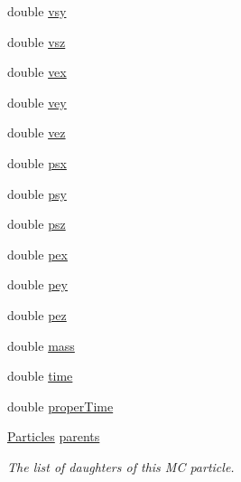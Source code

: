 \begin{DoxyCompactItemize}
\item 
double \hyperlink{class_d_d4hep_1_1_simulation_1_1_geant4_particle_a59b9d6e764aa6ea6c2cf011aba056c29}{vsy}
\item 
double \hyperlink{class_d_d4hep_1_1_simulation_1_1_geant4_particle_aba9c37b5693ebe378cd17519228daa3d}{vsz}
\item 
double \hyperlink{class_d_d4hep_1_1_simulation_1_1_geant4_particle_a28b83040272870e04caff34da5846464}{vex}
\item 
double \hyperlink{class_d_d4hep_1_1_simulation_1_1_geant4_particle_a1befe26ea99280bd0a57d6d858165ef6}{vey}
\item 
double \hyperlink{class_d_d4hep_1_1_simulation_1_1_geant4_particle_a63ac22451aea71547d69c407ae4824da}{vez}
\item 
double \hyperlink{class_d_d4hep_1_1_simulation_1_1_geant4_particle_a2c169e0bf0dc706a43254c4c8ca9ccc2}{psx}
\item 
double \hyperlink{class_d_d4hep_1_1_simulation_1_1_geant4_particle_abc3b6008b4d4366bce059fa360e8d3c7}{psy}
\item 
double \hyperlink{class_d_d4hep_1_1_simulation_1_1_geant4_particle_a1caec949ea63cfe52c101007c0ebcaea}{psz}
\item 
double \hyperlink{class_d_d4hep_1_1_simulation_1_1_geant4_particle_a6ac77a569db28fb000fa4cd33c6dbc25}{pex}
\item 
double \hyperlink{class_d_d4hep_1_1_simulation_1_1_geant4_particle_a17f6e47420fc54bc5b6440e26f0181e2}{pey}
\item 
double \hyperlink{class_d_d4hep_1_1_simulation_1_1_geant4_particle_a83de70580c139f049a057c0e185812d1}{pez}
\item 
double \hyperlink{class_d_d4hep_1_1_simulation_1_1_geant4_particle_aeb13e47e5c91dcfbfac27f41552b8298}{mass}
\item 
double \hyperlink{class_d_d4hep_1_1_simulation_1_1_geant4_particle_a01f4419807130fecc3a596659115fd00}{time}
\item 
double \hyperlink{class_d_d4hep_1_1_simulation_1_1_geant4_particle_a8799faf00417956ea2f814ee2ad086ee}{proper\+Time}
\item 
\hyperlink{class_d_d4hep_1_1_simulation_1_1_geant4_particle_a123ad778eff51ea80ce778d54776c072}{Particles} \hyperlink{class_d_d4hep_1_1_simulation_1_1_geant4_particle_a78909a136dade0e85770a6e0edb3bdad}{parents}
\begin{DoxyCompactList}\small\item\em The list of daughters of this MC particle. \end{DoxyCompactList}\item 

\end{DoxyCompactItemize}
